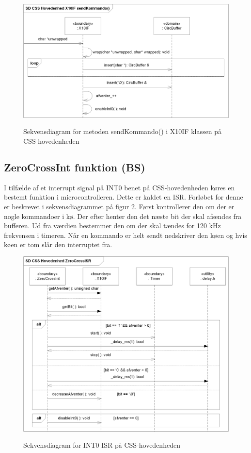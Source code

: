 \begin{figure}[!htb]
     {\includegraphics[width=\textwidth]{billeder/uml/CSS_X10IF_sendKommando_SD}}
     \caption{Sekvensdiagram for metoden sendKommando() i X10IF klassen på CSS hovedenheden}
     \label{fig:X10_sendKommando_sd}
\end{figure}

\subsection{ZeroCrossInt funktion (BS)}
I tilfælde af et interrupt signal på INT0 benet på CSS-hovedenheden køres en bestemt funktion i microcontrolleren. Dette er kaldet en ISR. Forløbet for denne er beskrevet i sekvensdiagrammet på figur \ref{fig:ZeroCrossISR}.
Først kontrollerer den om der er nogle kommandoer i kø. Der efter henter den det næste bit der skal afsendes fra bufferen. Ud fra værdien bestemmer den om der skal tændes for 120 kHz frekvensen i timeren. Når en kommando er helt sendt nedskriver den køen og hvis køen er tom slår den interruptet fra.

\begin{figure}[!htb]
     {\includegraphics[width=\textwidth]{billeder/uml/CSS_ZeroCrossInt_SD}}
     \caption{Sekvensdiagram for INT0 ISR på CSS-hovedenheden}
     \label{fig:ZeroCrossISR}
\end{figure}

